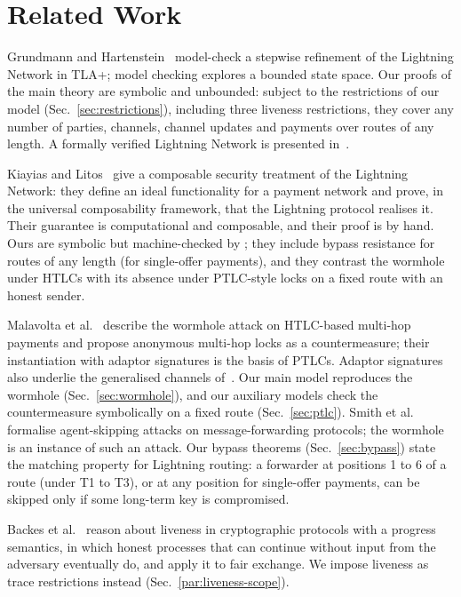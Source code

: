 \section{Related Work}\label{sec:related}

Grundmann and Hartenstein~\cite{grundmann2026} model-check a stepwise refinement of the
Lightning Network in TLA+; model checking explores a bounded state space. Our \tamarin{} proofs
of the main theory are symbolic and unbounded: subject to the restrictions of our model
(Sec.~\ref{sec:restrictions}), including three liveness restrictions, they cover any number of
parties, channels, channel updates and payments over routes of any length. A formally verified
Lightning Network is presented in~\cite{litos2026}.

Kiayias and Litos~\cite{kiayias2020} give a composable security treatment of the Lightning
Network: they define an ideal functionality for a payment network and prove, in the universal
composability framework, that the Lightning protocol realises it. Their guarantee is
computational and composable, and their proof is by hand. Ours are symbolic but machine-checked
by \tamarin; they include bypass resistance for routes of any length (for single-offer
payments), and they contrast the wormhole under HTLCs with its absence under PTLC-style locks on
a fixed route with an honest sender.

Malavolta et al.~\cite{malavolta2019} describe the wormhole attack on HTLC-based multi-hop
payments and propose anonymous multi-hop locks as a countermeasure; their instantiation with
adaptor signatures is the basis of PTLCs. Adaptor signatures also underlie the generalised
channels of~\cite{aumayr2021}. Our main
model reproduces the wormhole (Sec.~\ref{sec:wormhole}), and our auxiliary models check the
countermeasure symbolically on a fixed route (Sec.~\ref{sec:ptlc}).
Smith et al.~\cite{smith2022} formalise agent-skipping attacks on message-forwarding protocols;
the wormhole is an instance of such an attack. Our bypass theorems (Sec.~\ref{sec:bypass}) state
the matching property for Lightning routing: a forwarder at positions 1 to 6 of a
route (under T1 to T3), or at any position for single-offer payments, can be skipped only if some long-term key
is compromised.

Backes et al.~\cite{backes2017} reason about liveness in cryptographic protocols with a progress
semantics, in which honest processes that can continue without input from the adversary
eventually do, and apply it to fair exchange. We impose liveness as trace restrictions instead
(Sec.~\ref{par:liveness-scope}).

